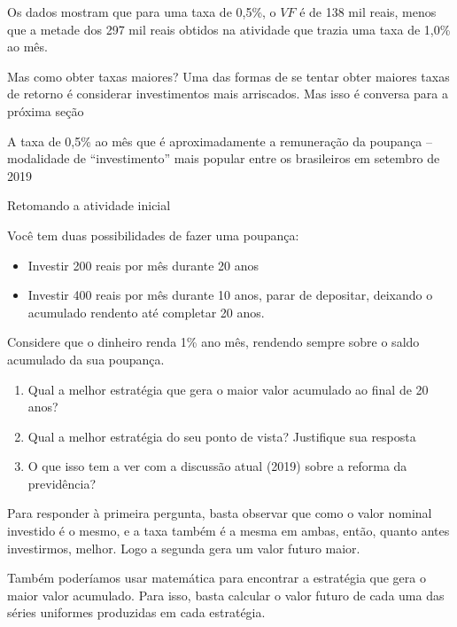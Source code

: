 Os dados mostram que para uma taxa de 0,5\%, o $VF$ é de 138 mil reais, menos que a metade dos 297 mil reais obtidos na atividade que trazia uma taxa de 1,0\% ao mês. 

Mas como obter taxas maiores? Uma das formas de se tentar obter maiores taxas de retorno é considerar investimentos mais arriscados. Mas isso é conversa para a próxima seção

\begin{knowledge}

A taxa de 0,5\% ao mês que é aproximadamente a remuneração da poupança – modalidade de “investimento” mais popular entre os brasileiros em setembro de 2019

\end{knowledge}



\begin{example}{Retomando a atividade inicial}

Você tem duas possibilidades de fazer uma poupança:
\begin{itemize}
\item Investir 200 reais por mês durante 20 anos
\item Investir 400 reais por mês durante 10 anos, parar de depositar, deixando o acumulado rendento até completar 20 anos.

\end{itemize}

Considere que o dinheiro renda 1\% ano mês, rendendo sempre sobre o saldo acumulado da sua poupança.

\begin{enumerate}

\item Qual a melhor estratégia que gera o maior valor acumulado ao final de 20 anos?

\item Qual a melhor estratégia do seu ponto de vista? Justifique sua resposta

\item O que isso tem a ver com a discussão atual (2019) sobre a reforma da previdência?

\end{enumerate}

Para responder à primeira pergunta, basta observar que como o valor nominal investido é o mesmo, e a taxa também é a mesma em ambas, então, quanto antes investirmos, melhor. Logo a segunda gera um valor futuro maior.

Também poderíamos usar matemática para encontrar a estratégia que gera o maior valor acumulado. Para isso, basta calcular o valor futuro de cada uma das séries uniformes produzidas em cada estratégia. 


\end{example}
